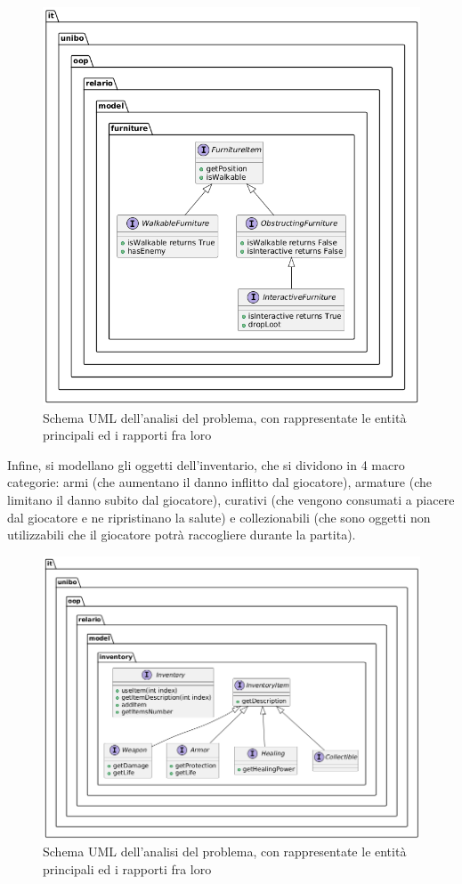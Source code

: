 \documentclass[a4paper,12pt]{report}
\begin{document}
\begin{figure}[H]
	\centering{}
	\includegraphics[width=\textwidth]{img/FurnitureItems.png}
	\caption{Schema UML dell'analisi del problema, con rappresentate le entità principali ed i rapporti fra loro}
	\label{img:furnitureAnalysis}
\end{figure}
%
Infine, si modellano gli oggetti dell'inventario, che si dividono in 4 macro categorie: armi (che aumentano il
danno inflitto dal giocatore), armature (che limitano il danno subito dal giocatore), curativi (che vengono consumati
a piacere dal giocatore e ne ripristinano la salute) e collezionabili (che sono oggetti non utilizzabili che il
giocatore potrà raccogliere durante la partita).
%
\begin{figure}[H]
	\centering{}
	\includegraphics[width=\textwidth]{img/InventoryItems.png}
	\caption{Schema UML dell'analisi del problema, con rappresentate le entità principali ed i rapporti fra loro}
	\label{img:inventoryItemsAnalysis}
\end{figure}
%
\end{document}
